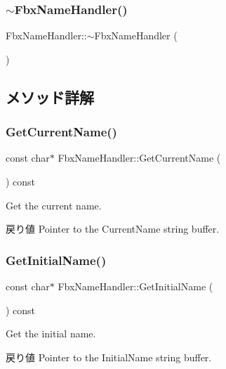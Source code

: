 \subsubsection{\texorpdfstring{$\sim$\+Fbx\+Name\+Handler()}{~FbxNameHandler()}}
{\footnotesize\ttfamily Fbx\+Name\+Handler\+::$\sim$\+Fbx\+Name\+Handler (\begin{DoxyParamCaption}{ }\end{DoxyParamCaption})}



\subsection{メソッド詳解}
\mbox{\label{class_fbx_name_handler_a1be12daa1efe1f289972f7cb81bc64fb}} 
\subsubsection{\texorpdfstring{Get\+Current\+Name()}{GetCurrentName()}}
{\footnotesize\ttfamily const char$\ast$ Fbx\+Name\+Handler\+::\+Get\+Current\+Name (\begin{DoxyParamCaption}{ }\end{DoxyParamCaption}) const}

Get the current name. \begin{DoxyReturn}{戻り値}
Pointer to the Current\+Name string buffer. 
\end{DoxyReturn}
\mbox{\label{class_fbx_name_handler_a266f9693873fa9042673fac6b1ae630d}} 
\subsubsection{\texorpdfstring{Get\+Initial\+Name()}{GetInitialName()}}
{\footnotesize\ttfamily const char$\ast$ Fbx\+Name\+Handler\+::\+Get\+Initial\+Name (\begin{DoxyParamCaption}{ }\end{DoxyParamCaption}) const}

Get the initial name. \begin{DoxyReturn}{戻り値}
Pointer to the Initial\+Name string buffer. 
\end{DoxyReturn}
\mbox{\label{class_fbx_name_handler_a7767797106861dea5bef81b8ab592dfd}} 
